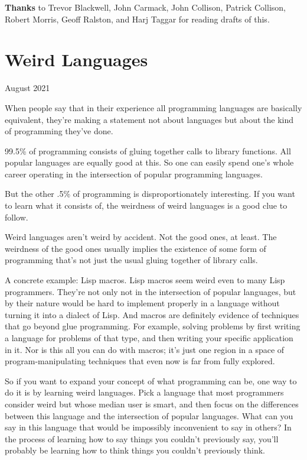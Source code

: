 \documentclass[12pt]{book}
\begin{document}
\textbf{Thanks} to Trevor Blackwell, John Carmack, John Collison,
Patrick Collison, Robert Morris, Geoff Ralston, and Harj Taggar for
reading drafts of this.
\chapter{Weird Languages}

August 2021

When people say that in their experience all programming languages are
basically equivalent, they're making a statement not about languages but
about the kind of programming they've done.

99.5\% of programming consists of gluing together calls to library
functions. All popular languages are equally good at this. So one can
easily spend one's whole career operating in the intersection of popular
programming languages.

But the other .5\% of programming is disproportionately interesting. If
you want to learn what it consists of, the weirdness of weird languages
is a good clue to follow.

Weird languages aren't weird by accident. Not the good ones, at least.
The weirdness of the good ones usually implies the existence of some
form of programming that's not just the usual gluing together of library
calls.

A concrete example: Lisp macros. Lisp macros seem weird even to many
Lisp programmers. They're not only not in the intersection of popular
languages, but by their nature would be hard to implement properly in a
language without turning it into a dialect of Lisp. And macros are
definitely evidence of techniques that go beyond glue programming. For
example, solving problems by first writing a language for problems of
that type, and then writing your specific application in it. Nor is this
all you can do with macros; it's just one region in a space of
program-manipulating techniques that even now is far from fully
explored.

So if you want to expand your concept of what programming can be, one
way to do it is by learning weird languages. Pick a language that most
programmers consider weird but whose median user is smart, and then
focus on the differences between this language and the intersection of
popular languages. What can you say in this language that would be
impossibly inconvenient to say in others? In the process of learning how
to say things you couldn't previously say, you'll probably be learning
how to think things you couldn't previously think.
\end{document}
